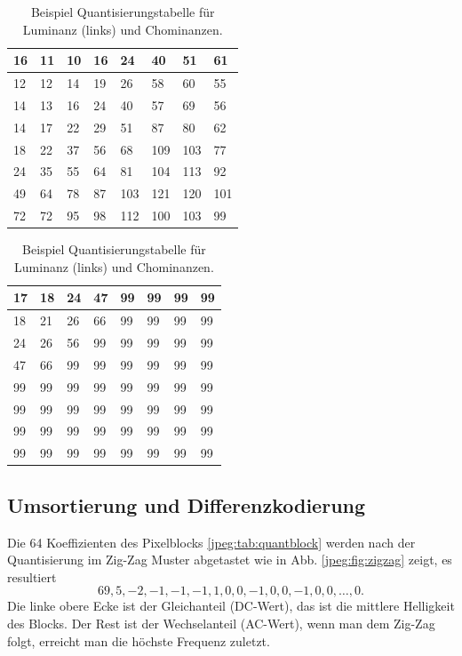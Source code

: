 \begin{table}[b]
    \centering
    \begin{tabularx}{0.47\linewidth}{|X|X|X|X|X|X|X|X|}
        \hline
        16 & 11 & 10 & 16 & 24  & 40 & 51 & 61    \\ \hline
        12 & 12 & 14 & 19 & 26  & 58 & 60 & 55    \\ \hline
        14 & 13 & 16 & 24 & 40  & 57 & 69 & 56    \\ \hline
        14 & 17 & 22 & 29 & 51  & 87 & 80 & 62    \\ \hline
        18 & 22 & 37 & 56 & 68  & 109 & 103 & 77  \\ \hline
        24 & 35 & 55 & 64 & 81  & 104 & 113 & 92  \\ \hline
        49 & 64 & 78 & 87 & 103 & 121 & 120 & 101 \\ \hline
        72 & 72 & 95 & 98 & 112 & 100 & 103 & 99  \\ \hline        
    \end{tabularx}
    \qquad
    \begin{tabularx}{0.47\linewidth}{|X|X|X|X|X|X|X|X|}
        \hline
        17 & 18 & 24 & 47 & 99 & 99 & 99 & 99  \\ \hline
        18 & 21 & 26 & 66 & 99 & 99 & 99 & 99  \\ \hline
        24 & 26 & 56 & 99 & 99 & 99 & 99 & 99  \\ \hline
        47 & 66 & 99 & 99 & 99 & 99 & 99 & 99  \\ \hline
        99 & 99 & 99 & 99 & 99 & 99 & 99 & 99  \\ \hline
        99 & 99 & 99 & 99 & 99 & 99 & 99 & 99  \\ \hline
        99 & 99 & 99 & 99 & 99 & 99 & 99 & 99  \\ \hline
        99 & 99 & 99 & 99 & 99 & 99 & 99 & 99  \\ \hline  	  
    \end{tabularx}
    \caption{Beispiel Quantisierungstabelle für Luminanz (links) und Chominanzen.
        \label{jpeg:tab:quant}}
\end{table}



\subsection{Umsortierung und Differenzkodierung
\label{jpeg:subsection:umsortierung}}
Die 64 Koeffizienten des Pixelblocks \ref{jpeg:tab:quantblock} werden nach der Quantisierung im Zig-Zag Muster abgetastet wie in Abb. \ref{jpeg:fig:zigzag} zeigt, es resultiert
\begin{equation}
    69, 5, -2, -1, -1, -1, 1, 0, 0, -1, 0, 0, -1, 0, 0,\dots, 0.
    \label{jpeg:equation:abgetastet}
\end{equation}
Die linke obere Ecke ist der Gleichanteil (DC-Wert), das ist die mittlere Helligkeit des Blocks.
Der Rest ist der Wechselanteil (AC-Wert), wenn man dem Zig-Zag folgt, erreicht man die höchste Frequenz zuletzt.

